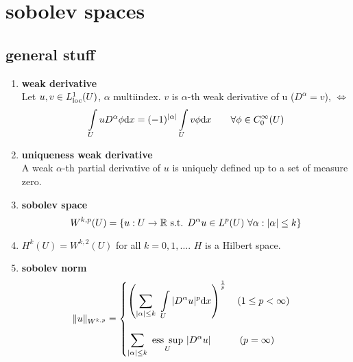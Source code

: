 
\section{sobolev spaces}

\subsection{general stuff}

\begin{enumerate}[label=(\alph*)]
	\item \textbf{weak derivative}\\
	Let $u,v \in L^1_{\text{loc}}(U)$, $\alpha$ multiindex. $v$ is $\alpha$-th weak derivative of u ($D^{\alpha} = v$), $\iff$
	\begin{equation*}
	\int \limits_U u D^{\alpha}\phi \mathrm{d} x = (-1)^{|\alpha|} \int \limits_U v\phi \mathrm{d} x \qquad \forall \phi \in C^\infty_0(U)
	\end{equation*}
	
	\item \textbf{uniqueness weak derivative}\\
	A weak  $\alpha$-th partial derivative of $u$ is uniquely defined up to a set of measure zero.
	
	\item \textbf{sobolev space}
	\begin{equation*}
		W^{k,p}(U) = \{ u: U \to \mathbb{R} \text{ s.t. } D^{\alpha}u \in L^p(U)\  \forall \alpha: |\alpha| \leq k \}
	\end{equation*}
	\item $H^k(U) = W^{k,2}(U)$ for all $k = 0,1,\dots$. $H$ is a Hilbert space.
	
	\item \textbf{sobolev norm}
	\begin{equation*}
		\|u\|_{W^{k,p}} = 
		\begin{cases}
		\left( \displaystyle \sum_{|\alpha|\leq k}\  \int \limits_U |D^{\alpha}u|^p  \mathrm{d} x \right)^{\frac{1}{p}} \quad (1 \leq p< \infty)\\
		\\
		\displaystyle \sum_{|\alpha|\leq k}\  \underset{U}{\text{ess }\sup}\  |D^{\alpha}u| \qquad \quad  (p = \infty)
		\end{cases}
	\end{equation*}
	

\end{enumerate}
